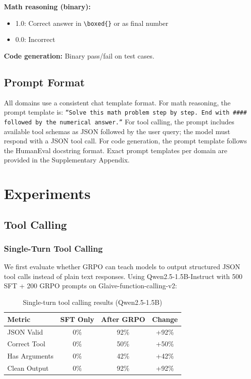 \documentclass{article}
\begin{document}
\textbf{Math reasoning (binary):}
\begin{itemize}
    \item 1.0: Correct answer in \texttt{\textbackslash boxed\{\}} or as final number
    \item 0.0: Incorrect
\end{itemize}

\textbf{Code generation:} Binary pass/fail on test cases.

\subsection{Prompt Format}

All domains use a consistent chat template format. For math reasoning, the prompt template is: \texttt{``Solve this math problem step by step. End with \#\#\#\# followed by the numerical answer.''} For tool calling, the prompt includes available tool schemas as JSON followed by the user query; the model must respond with a JSON tool call. For code generation, the prompt template follows the HumanEval docstring format. Exact prompt templates per domain are provided in the Supplementary Appendix.

\section{Experiments}

\subsection{Tool Calling}

\subsubsection{Single-Turn Tool Calling}

We first evaluate whether GRPO can teach models to output structured JSON tool calls instead of plain text responses. Using Qwen2.5-1.5B-Instruct with 500 SFT + 200 GRPO prompts on Glaive-function-calling-v2:

\begin{table}[htbp]
    \centering
    \caption{Single-turn tool calling results (Qwen2.5-1.5B)}
    \begin{tabular}{lccc}
        \toprule
        Metric & SFT Only & After GRPO & Change \\
        \midrule
        JSON Valid & 0\% & 92\% & +92\% \\
        Correct Tool & 0\% & 50\% & +50\% \\
        Has Arguments & 0\% & 42\% & +42\% \\
        Clean Output & 0\% & 92\% & +92\% \\
        \bottomrule
    \end{tabular}
    \label{tab:single_turn}
\end{table}
\end{document}
